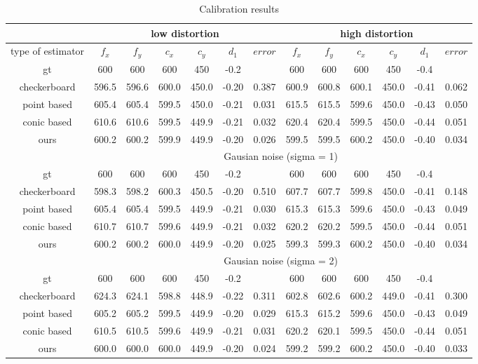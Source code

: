 \begin{table}[t!]
    \centering
    \caption{Calibration results}
    \label{tab:cal_results1}
    \resizebox{0.9\textwidth}{!} {
    \begin{tabular}{c|cccccc|cccccc}    
        \hline
        &\multicolumn{6}{c|}{low distortion}&\multicolumn{6}{c}{high distortion}\\
        \hline
        type of estimator & $f_x$ & $f_y$ &  $c_x$ & $c_y$&  $d_1$ & $error$&$f_x$ & $f_y$ &  $c_x$ & $c_y$&  $d_1$ & $error$ \\
        \hline
        gt & 600 & 600 & 600 & 450 & -0.2 & & 600 & 600 & 600 & 450 & -0.4&\\
        checkerboard & 596.5&	596.6&	600.0&	450.0&	-0.20&0.387&600.9&	600.8&	600.1&	450.0&	-0.41&0.062\\
        point based & 605.4&	605.4&	599.5&	450.0&	-0.21&0.031 &615.5&	615.5	&599.6&	450.0&	-0.43&0.050\\
        conic based &610.6&	610.6&	599.5&	449.9&	-0.21&0.032&620.4&	620.4&	599.5&	450.0	&-0.44&	0.051\\
        ours & 600.2&	600.2&	599.9	&449.9&	-0.20&	0.026&599.5	&599.5&	600.2&	450.0&	-0.40&	0.034\\
        \hline
        &\multicolumn{12}{c}{Gausian noise (sigma = 1)}\\
        \hline
        gt & 600 & 600 & 600 & 450 & -0.2 & & 600 & 600 & 600 & 450 & -0.4&\\
        checkerboard & 598.3&	598.2&	600.3&	450.5&	-0.20&	0.510&  607.7&	607.7	&599.8&	450.0&	-0.41&	0.148\\
        point based& 605.4&	605.4&	599.5&	449.9&	-0.21&	0.030& 615.3&	615.3	&599.6&	450.0&	-0.43	&0.049\\
        conic based &610.7&	610.7&	599.6&	449.9&	-0.21&	0.032 &   620.2&	620.2	&599.5&	450.0&	-0.44&	0.051\\
        ours & 600.2&	600.2&	600.0&	449.9&	-0.20&	0.025&  599.3&	599.3&	600.2&	450.0&	-0.40&	0.034\\
        \hline
        &\multicolumn{12}{c}{Gausian noise (sigma = 2)}\\
        \hline
        gt & 600 & 600 & 600 & 450 & -0.2 & & 600 & 600 & 600 & 450 & -0.4&\\
        checkerboard & 624.3&	624.1	&598.8&	448.9&	-0.22&	0.311&  602.8&	602.6&	600.2&	449.0&	-0.41&	0.300\\
        point based& 605.2&	605.2&	599.5&	449.9&	-0.20&	0.029 &   615.3	&615.2	&599.6&	450.0	&-0.43&	0.049\\
        conic based &610.5	&610.5&	599.6&	449.9&	-0.21&	0.031 &   620.2&	620.1	&599.5&	450.0&	-0.44&	0.051\\
        ours & 600.0&	600.0&	600.0&	449.9&	-0.20&	0.024 & 599.2&	599.2&	600.2&	450.0&	-0.40	&0.033\\
        
        
        \hline
    \end{tabular}
    }
\end{table}